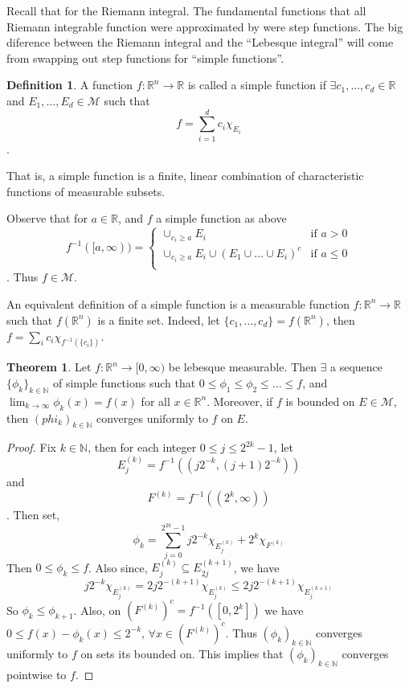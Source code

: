\documentclass{article}
\theoremstyle{definition}
\newtheorem{definition}{Definition}[section]
\newtheorem{theorem}{Theorem}[section]
\theoremstyle{remark}
\theoremstyle{remark}
\def\reals{{\mathbb R}}
\def\scriptm{{\mathcal M}}
\def\naturals{{\mathbb N}}
\begin{document}
Recall that for the Riemann integral. The fundamental functions that all Riemann integrable function were approximated by were step functions. The big diference between the Riemann integral and the ``Lebesque integral'' will come from swapping out step functions for ``simple functions''. 
\begin{definition}
A function $f: \reals^n \to \reals$ is called a simple function if $\exists c_1, \dots, c_d \in \reals$ and $E_1, \dots, E_d \in \scriptm$ such that $$f = \sum_{i=1}^d c_i \chi_{E_i}$$.

That is, a simple function is a finite, linear combination of characteristic functions of measurable subsets.
\end{definition}

Observe that for $a\in \reals$, and $f$ a simple function as above $$f^{-1}([a, \infty)) = \begin{cases} 
\cup_{c_i \geq a} E_i & \text{if } a > 0 \\
\cup_{c_i \geq a} E_i \cup (E_1 \cup \dots \cup E_i)^c & \text{if } a \leq 0 \\
\end{cases}$$. Thus $f \in \scriptm$. 

An equivalent definition of a simple function is a measurable function $f: \reals^n \to \reals$ such that $f(\reals^n)$ is a finite set. Indeed, let $\{c_1, \dots, c_d\} = f(\reals^n)$, then $f = \sum_i c_i \chi_{f^{-1}(\{c_i\})}$.

\begin{theorem}
Let $f: \reals^n \to [0, \infty)$ be lebesque measurable. Then $\exists$ a sequence $\{\phi_k\}_{k\in\naturals}$ of simple functions such that $0 \leq \phi_1 \leq \phi_2 \leq \dots \leq f$, and $\lim_{k\to\infty} \phi_k(x) = f(x)$ for all $x\in \reals^n$. Moreover, if $f$ is bounded on $E \in \scriptm$, then $(phi_k)_{k\in\naturals}$ converges uniformly to $f$ on $E$. 
\end{theorem}
\begin{proof}
Fix $k\in\naturals$, then for each integer $0 \leq j \leq 2^{2k} - 1$, let
$$E^{(k)}_j = f^{-1}((j2^{-k}, (j+1)2^{-k}))$$ and
$$F^{(k)} = f^{-1}((2^k, \infty))$$. 
Then set, 
$$\phi_k = \sum_{j=0}^{2^{2k} - 1} j2^{-k} \chi_{E^{(k)}_j} + 2^k\chi_{F^{(k)}}$$
Then $0  \leq \phi_k \leq f$. Also since, $E_j^{(k)} \subseteq E_{2j}^{(k+1)}$, we have
$$j2^{-k}\chi_{E_j^{(k)}} = 2j2^{-(k+1)} \chi_{E_j^{(k)}} \leq 2j2^{-(k+1)} \chi_{E_j^{(k+1)}}$$
So $\phi_k \leq \phi_{k+1}$. Also, on $(F^{(k)})^c = f^{-1}([0, 2^k])$ we have $0 \leq f(x) - \phi_k(x) \leq 2^{-k}$, $\forall x \in (F^{(k)})^c$. Thus $(\phi_k)_{k\in\naturals}$ converges uniformly to $f$ on sets its bounded on. This implies that $(\phi_k)_{k\in\naturals}$ converges pointwise to $f$.
\end{proof}
\end{document}
